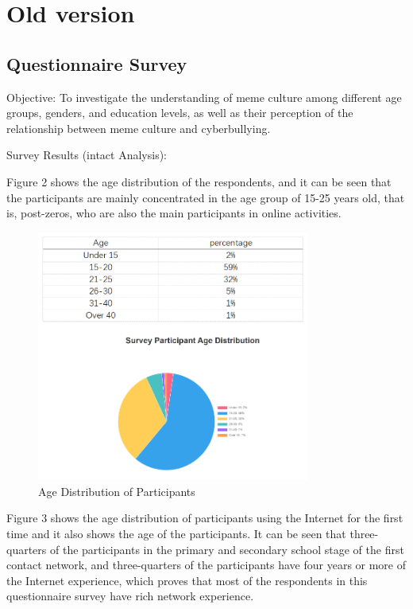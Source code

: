 \documentclass[12pt,a4paper]{ctexart}
\theoremstyle{MyLineTheoremStyle}
\theoremstyle{MyBlockTheoremStyle}
\theoremstyle{MySubsubsectionStyle}
\begin{document}
\section{Old version}
\subsection{Questionnaire Survey}

Objective: To investigate the understanding of meme culture among different age groups, genders, and education levels, as well as their perception of the relationship between meme culture and cyberbullying.

Survey Results (intact Analysis):

Figure 2 shows the age distribution of the respondents, and it can be seen that the participants are mainly concentrated in the age group of 15-25 years old, that is, post-zeros, who are also the main participants in online activities.

\begin{figure}[htbp]
    \centering
    \includegraphics[width=0.8\textwidth]{img/age_distribution.png}
    \caption{Age Distribution of Participants}
    \label{fig:age_distribution}
\end{figure}
\newpage

Figure 3 shows the age distribution of participants using the Internet for the first time and it also shows the age of the participants. It can be seen that three-quarters of the participants in the primary and secondary school stage of the first contact network, and three-quarters of the participants have four years or more of the Internet experience, which proves that most of the respondents in this questionnaire survey have rich network experience.
\end{document}
